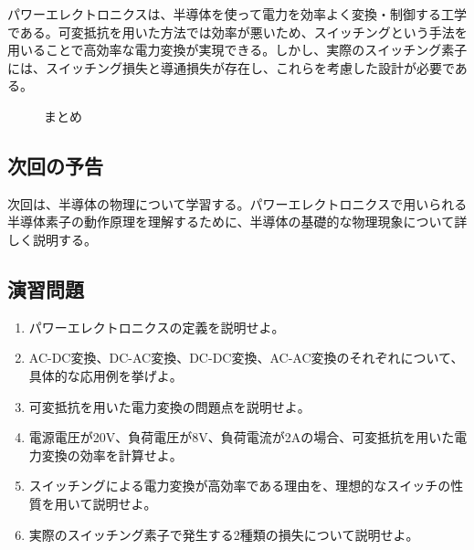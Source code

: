 パワーエレクトロニクスは、半導体を使って電力を効率よく変換・制御する工学である。可変抵抗を用いた方法では効率が悪いため、スイッチングという手法を用いることで高効率な電力変換が実現できる。しかし、実際のスイッチング素子には、スイッチング損失と導通損失が存在し、これらを考慮した設計が必要である。

\begin{figure}[H]
\centering
{}
\caption{まとめ}
\label{fig:summary}
\end{figure}

\subsection{次回の予告}

次回は、半導体の物理について学習する。パワーエレクトロニクスで用いられる半導体素子の動作原理を理解するために、半導体の基礎的な物理現象について詳しく説明する。

\subsection{演習問題}

\begin{enumerate}
\item パワーエレクトロニクスの定義を説明せよ。
\item AC-DC変換、DC-AC変換、DC-DC変換、AC-AC変換のそれぞれについて、具体的な応用例を挙げよ。
\item 可変抵抗を用いた電力変換の問題点を説明せよ。
\item 電源電圧が20V、負荷電圧が8V、負荷電流が2Aの場合、可変抵抗を用いた電力変換の効率を計算せよ。
\item スイッチングによる電力変換が高効率である理由を、理想的なスイッチの性質を用いて説明せよ。
\item 実際のスイッチング素子で発生する2種類の損失について説明せよ。
\end{enumerate}
